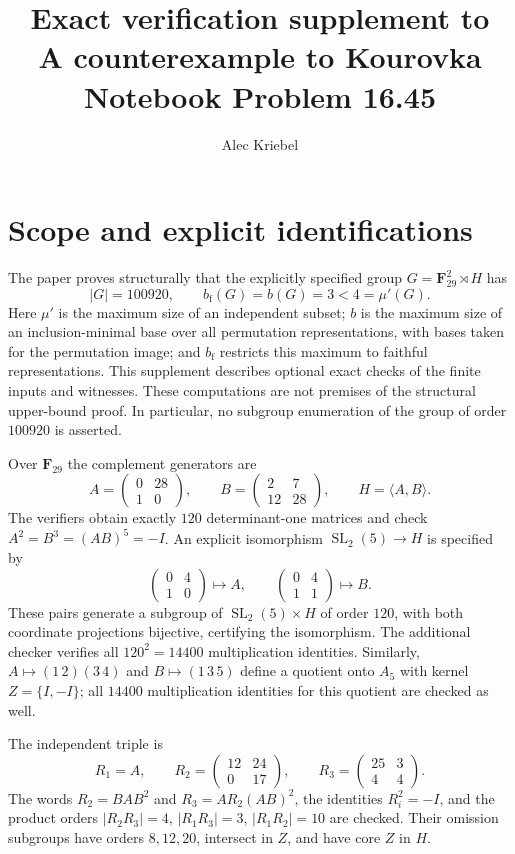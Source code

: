\documentclass[11pt]{amsart}
\title[Exact verification supplement]{Exact verification supplement to\\
A counterexample to Kourovka Notebook Problem 16.45}
\author{Alec Kriebel}
\date{}
\newcommand{\F}{\mathbf F}
\newcommand{\SL}{\operatorname{SL}}
\newcommand{\mup}{\mu'}
\newcommand{\bfth}{b_{\mathrm f}}
\begin{document}
\maketitle

\section{Scope and explicit identifications}

The paper proves structurally that the explicitly specified group
$G=\F_{29}^2\rtimes H$ has
\[
 |G|=100920,\qquad \bfth(G)=b(G)=3<4=\mup(G).
\]
Here $\mup$ is the maximum size of an independent subset; $b$ is the maximum
size of an inclusion-minimal base over all permutation representations,
with bases taken for the permutation image; and $\bfth$ restricts this
maximum to faithful representations. This supplement describes optional
exact checks of the finite inputs and witnesses. These computations are not
premises of the structural upper-bound proof. In particular, no subgroup
enumeration of the group of order $100920$ is asserted.

Over $\F_{29}$ the complement generators are
\[
 A=\begin{pmatrix}0&28\\1&0\end{pmatrix},\qquad
 B=\begin{pmatrix}2&7\\12&28\end{pmatrix},\qquad H=\langle A,B\rangle.
\]
The verifiers obtain exactly $120$ determinant-one matrices and check
$A^2=B^3=(AB)^5=-I$. An explicit isomorphism $\SL_2(5)\to H$ is specified by
\[
 \begin{pmatrix}0&4\\1&0\end{pmatrix}\longmapsto A,
 \qquad
 \begin{pmatrix}0&4\\1&1\end{pmatrix}\longmapsto B.
\]
These pairs generate a subgroup of $\SL_2(5)\times H$ of order $120$,
with both coordinate projections bijective, certifying the isomorphism.
The additional checker verifies all $120^2=14400$ multiplication identities.
Similarly, $A\mapsto(1\,2)(3\,4)$ and $B\mapsto(1\,3\,5)$ define
a quotient onto $A_5$ with kernel $Z=\{I,-I\}$; all $14400$
multiplication identities for this quotient are checked as well.

The independent triple is
\[
 R_1=A,\qquad R_2=\begin{pmatrix}12&24\\0&17\end{pmatrix},\qquad
 R_3=\begin{pmatrix}25&3\\4&4\end{pmatrix}.
\]
The words $R_2=BAB^2$ and $R_3=AR_2(AB)^2$, the identities $R_i^2=-I$,
and the product orders $|R_2R_3|=4$, $|R_1R_3|=3$, $|R_1R_2|=10$
are checked. Their omission subgroups have orders $8,12,20$, intersect
in $Z$, and have core $Z$ in $H$.
\end{document}
